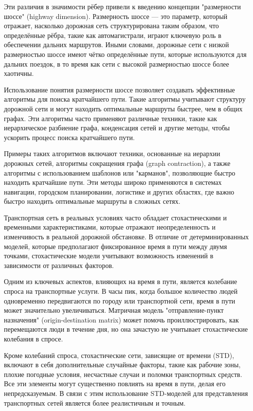 Эти различия в значимости рёбер привели к введению концепции "размерности шоссе" (highway dimension). Размерность шоссе — это параметр, который отражает, насколько дорожная сеть структурирована таким образом, что определённые рёбра, такие как автомагистрали, играют ключевую роль в обеспечении дальних маршрутов. Иными словами, дорожные сети с низкой размерностью шоссе имеют чётко определённые пути, которые используются для дальних поездок, в то время как сети с высокой размерностью шоссе более хаотичны.

Использование понятия размерности шоссе позволяет создавать эффективные алгоритмы для поиска кратчайшего пути. Такие алгоритмы учитывают структуру дорожной сети и могут находить оптимальные маршруты быстрее, чем в общих графах. Эти алгоритмы часто применяют различные техники, такие как иерархическое разбиение графа, конденсация сетей и другие методы, чтобы ускорить процесс поиска кратчайшего пути.

Примеры таких алгоритмов включают техники, основанные на иерархии дорожных сетей, алгоритмы сокращения графа (graph contraction), а также алгоритмы с использованием шаблонов или "карманов", позволяющие быстро находить кратчайшие пути. Эти методы широко применяются в системах навигации, городском планировании, логистике и других областях, где важно быстро находить оптимальные маршруты в сложных сетях.







Транспортная сеть в реальных условиях часто обладает стохастическими и временными характеристиками, которые отражают неопределенность и изменчивость в реальной дорожной обстановке. В отличие от детерминированных моделей, которые предполагают фиксированное время в пути между двумя точками, стохастические модели учитывают возможность изменений в зависимости от различных факторов.

Одним из ключевых аспектов, влияющих на время в пути, является колебание спроса на транспортные услуги. В часы пик, когда большое количество людей одновременно передвигаются по городу или транспортной сети, время в пути может значительно увеличиваться. Матричная модель "отправление-пункт назначения" (origin-destination matrix) может помочь проиллюстрировать, как перемещаются люди в течение дня, но она зачастую не учитывает стохастические колебания в спросе.

Кроме колебаний спроса, стохастические сети, зависящие от времени (STD), включают в себя дополнительные случайные факторы, такие как рабочие зоны, плохие погодные условия, несчастные случаи и поломки транспортных средств. Все эти элементы могут существенно повлиять на время в пути, делая его непредсказуемым. В связи с этим использование STD-моделей для представления транспортных сетей является более реалистичным и точным.

